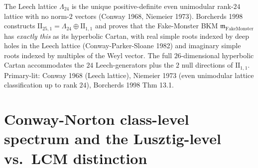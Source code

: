 \begin{remark}
\label{rem:latfnd-w17-leech-in-II-25-1}
The Leech lattice $\Lambda_{24}$ is the unique positive-definite even
unimodular rank-$24$ lattice with no norm-$2$ vectors (Conway 1968,
Niemeier 1973). Borcherds 1998 constructs
$\mathrm{II}_{25,1} = \Lambda_{24}\oplus\mathrm{II}_{1,1}$ and proves
that the Fake-Monster BKM $\mathfrak m_{\mathrm{FakeMonster}}$ has
\emph{exactly this} as its hyperbolic Cartan, with real simple roots
indexed by deep holes in the Leech lattice (Conway-Parker-Sloane
1982) and imaginary simple roots indexed by multiples of the
Weyl vector. The full $26$-dimensional hyperbolic Cartan accommodates
the $24$ Leech-generators plus the $2$ null directions of
$\mathrm{II}_{1,1}$. Primary-lit: Conway 1968 (Leech lattice),
Niemeier 1973 (even unimodular lattice classification up to rank
$24$), Borcherds 1998 Thm 13.1.
\end{remark}

\section{Conway-Norton class-level spectrum
and the Lusztig-level vs.\ LCM distinction}
\label{sec:latfnd-w18-witten-supplement}

